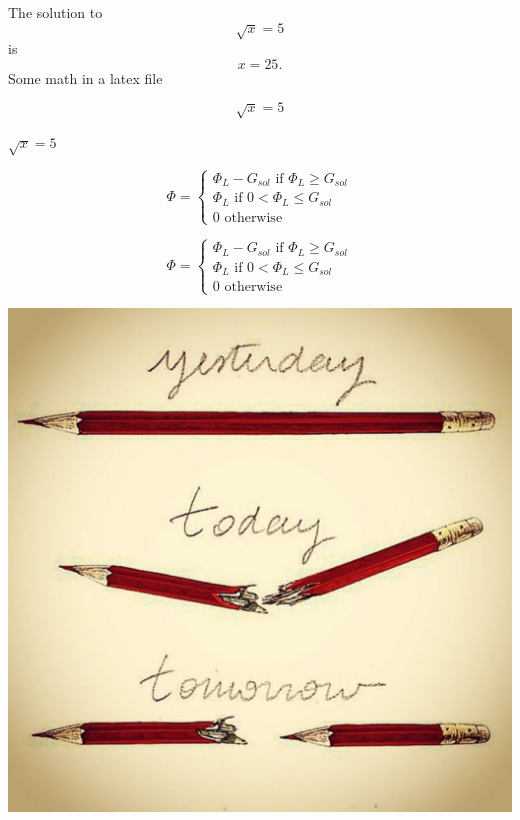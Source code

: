 \documentclass{article}
\begin{document}
The solution to \[\sqrt{x} = 5\] is \[x=25.\]
Some math in a latex file


\[\sqrt{x} = 5\]

\(\sqrt{x} = 5\)

$$
\Phi = \begin{cases}
\Phi_L - G_{sol} \text{ if } \Phi_L \geq G_{sol}\\
\Phi_L \text{ if }  0 <\Phi_L \leq G_{sol}\\
0 \text{ otherwise }
\end{cases}
$$

\begin{equation}
\Phi = \begin{cases}
\Phi_L - G_{sol} \text{ if } \Phi_L \geq G_{sol}\\
\Phi_L \text{ if }  0 <\Phi_L \leq G_{sol}\\
0 \text{ otherwise }
\end{cases}
\end{equation}

\includegraphics{test-image.jpg}
\end{document}
